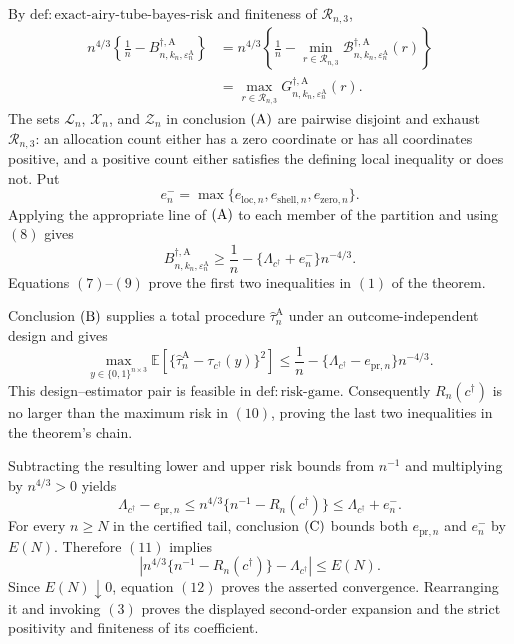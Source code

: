 By \(\mathrm{def:exact\text{-}airy\text{-}tube\text{-}bayes\text{-}risk}\)
and finiteness of \(\mathcal R_{n,3}\),
\[
\begin{aligned}
 n^{4/3}\left\{\frac1n-
 B_{n,k_n,\varepsilon_n^{\mathrm A}}^{\dagger,\mathrm A}\right\}
 &=n^{4/3}\left\{\frac1n-
 \min_{r\in\mathcal R_{n,3}}
 \mathcal B_{n,k_n,\varepsilon_n^{\mathrm A}}^{\dagger,\mathrm A}(r)\right\}\\
 &=\max_{r\in\mathcal R_{n,3}}
 G_{n,k_n,\varepsilon_n^{\mathrm A}}^{\dagger,\mathrm A}(r). \tag{8}
\end{aligned}
\]
The sets \(\mathcal L_n\), \(\mathcal X_n\), and \(\mathcal Z_n\) in
conclusion \({\rm(A)}\) are pairwise disjoint and exhaust
\(\mathcal R_{n,3}\): an allocation count either has a zero coordinate or has
all coordinates positive, and a positive count either satisfies the defining
local inequality or does not.  Put
\[
 e_n^-=\max\{e_{\mathrm{loc},n},e_{\mathrm{shell},n},
 e_{\mathrm{zero},n}\}.
\]
Applying the appropriate line of \({\rm(A)}\) to each member of the partition
and using \((8)\) gives
\[
 B_{n,k_n,\varepsilon_n^{\mathrm A}}^{\dagger,\mathrm A}
 \ge \frac1n-\{\Lambda_{c^\dagger}+e_n^-\}n^{-4/3}.          \tag{9}
\]
Equations \((7)\)--\((9)\) prove the first two inequalities in \((1)\) of the
theorem.

Conclusion \({\rm(B)}\) supplies a total procedure
\(\widehat\tau_n^{\mathrm A}\) under an outcome-independent design and gives
\[
 \max_{y\in\{0,1\}^{n\times3}}
 \mathbb E\!\left[
 \{\widehat\tau_n^{\mathrm A}-\tau_{c^\dagger}(y)\}^2\right]
 \le \frac1n-
 \{\Lambda_{c^\dagger}-e_{\mathrm{pr},n}\}n^{-4/3}.         \tag{10}
\]
This design--estimator pair is feasible in \(\mathrm{def:risk\text{-}game}\).
Consequently \(R_n(c^\dagger)\) is no larger than the maximum risk in
\((10)\), proving the last two inequalities in the theorem's chain.

Subtracting the resulting lower and upper risk bounds from \(n^{-1}\) and
multiplying by \(n^{4/3}>0\) yields
\[
 \Lambda_{c^\dagger}-e_{\mathrm{pr},n}
 \le n^{4/3}\{n^{-1}-R_n(c^\dagger)\}
 \le \Lambda_{c^\dagger}+e_n^-.                             \tag{11}
\]
For every \(n\ge N\) in the certified tail, conclusion \({\rm(C)}\) bounds
both \(e_{\mathrm{pr},n}\) and \(e_n^-\) by \(E(N)\).  Therefore \((11)\)
implies
\[
 \left|n^{4/3}\{n^{-1}-R_n(c^\dagger)\}
 -\Lambda_{c^\dagger}\right|\le E(N).                       \tag{12}
\]
Since \(E(N)\downarrow0\), equation \((12)\) proves the asserted convergence.
Rearranging it and invoking \((3)\) proves the displayed second-order
expansion and the strict positivity and finiteness of its coefficient.

